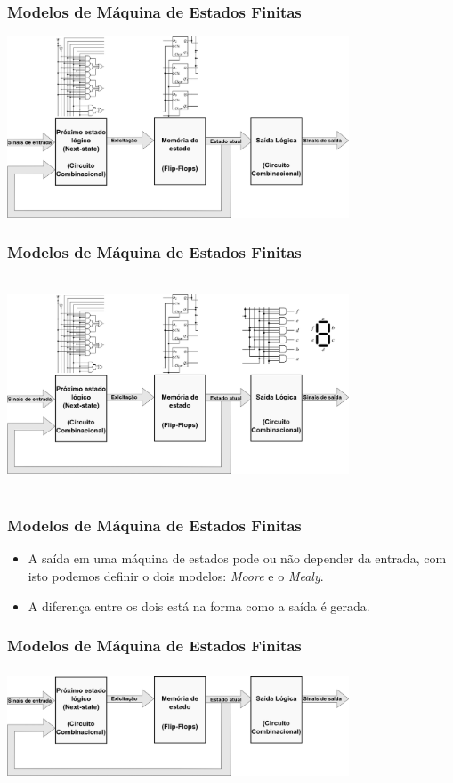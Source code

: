 \documentclass{beamer}
\begin{document}
\begin{frame}
  \frametitle{Modelos de Máquina de Estados Finitas}
    \includegraphics[height = 2in.5, width = 4in]{images/modelo_5.png}
\end{frame}

\begin{frame}
  \frametitle{Modelos de Máquina de Estados Finitas}
  \includegraphics[height = 2.5in, width = 4in]{images/modelo_6.png}
\end{frame}

\begin{frame}
  \frametitle{Modelos de Máquina de Estados Finitas}
  \begin{itemize}
    \item A saída em uma máquina de estados pode ou não depender da entrada, 
      com isto podemos definir o dois modelos: \textit{Moore} e o 
      \textit{Mealy}.
      \pause
    \item A diferença entre os dois está na forma como a saída é gerada.
  \end{itemize}
\end{frame}

\begin{frame}
  \frametitle{Modelos de Máquina de Estados Finitas}
  \includegraphics[height = 1.3in, width = 4in]{images/modelo_7.png}
\end{frame}
\end{document}
